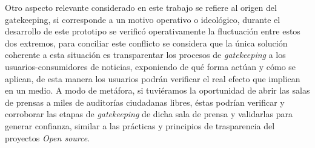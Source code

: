 Otro aspecto relevante considerado en este trabajo se refiere al origen del gatekeeping, si corresponde a un motivo operativo o ideológico, durante el desarrollo de este prototipo se verificó operativamente la fluctuación entre estos dos extremos, para conciliar este conflicto se considera que la única solución coherente a esta situación es transparentar los procesos de \emph{gatekeeping} a los usuarios-consumidores de noticias, exponiendo de qué forma actúan y cómo se aplican, de esta manera los usuarios podrán verificar el real efecto que implican en un medio. A modo de metáfora, si tuviéramos la oportunidad de abrir las salas de prensas a miles de auditorías ciudadanas libres, éstas podrían verificar y corroborar las etapas de \emph{gatekeeping} de dicha sala de prensa y validarlas para generar confianza, similar a las prácticas y principios de trasparencia del proyectos \emph{Open source}.